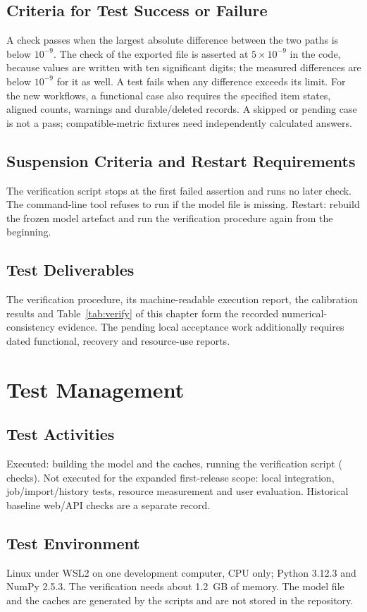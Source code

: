 \subsection{Criteria for Test Success or Failure}
A check passes when the largest absolute difference between the two paths is below $10^{-9}$. The check of the exported file is asserted at
$5\times10^{-9}$ in the code, because values are written with ten significant digits; the measured differences are below $10^{-9}$ for it as well.
A test fails when any difference exceeds its limit. For the new workflows, a functional case also
requires the specified item states, aligned counts, warnings and durable/deleted records. A skipped
or pending case is not a pass; compatible-metric fixtures need independently calculated answers.
\subsection{Suspension Criteria and Restart Requirements}
The verification script stops at the first failed assertion and runs no later check. The command-line tool refuses to run if the model file is missing.
Restart: rebuild the frozen model artefact and run the verification procedure again from the beginning.
\subsection{Test Deliverables}
The verification procedure, its machine-readable execution report, the calibration results and
Table~\ref{tab:verify} of this chapter form the recorded numerical-consistency evidence. The pending
local acceptance work additionally requires dated functional, recovery and resource-use reports.

\section{Test Management}
\subsection{Test Activities}
Executed: building the model and the caches, running the verification script (\nVerNChecks{} checks). Not executed for the expanded first-release scope: local integration, job/import/history tests,
resource measurement and user evaluation. Historical baseline web/API checks are a separate record.
\subsection{Test Environment}
Linux under WSL2 on one development computer, CPU only; Python 3.12.3 and NumPy 2.5.3. The verification needs about 1.2~GB of memory. The model file and the caches are generated by
the scripts and are not stored in the repository.
